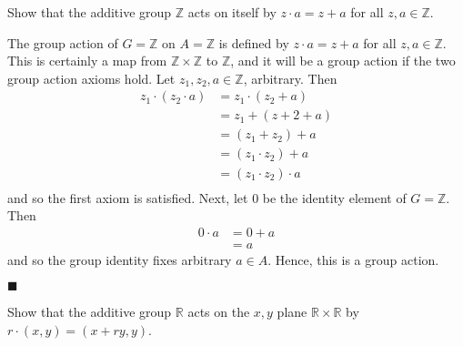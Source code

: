 \documentclass[12pt]{article}
\renewcommand{\qed}{\hfill$\blacksquare$}
\renewenvironment{proof}{\begin{addmargin}[1em]{0em}\begin{newproof}}{\end{newproof}\end{addmargin}\qed}
\newenvironment{problem}[2][Exercise]{\begin{trivlist}
\item[\hskip \labelsep {\bfseries #1}\hskip \labelsep {\bfseries #2.}]}{\end{trivlist}}
\begin{document}
\begin{problem}{1.7.2}
Show that the additive group $\mathbb{Z}$ acts on itself by $z\cdot a=z+a$ for all $z,a \in \mathbb{Z}$.
\end{problem}
\begin{proof}
The group action of $G=\mathbb{Z}$ on $A=\mathbb{Z}$ is defined by $z\cdot a=z+a$ for all $z,a \in \mathbb{Z}$. This is certainly a map from $\mathbb{Z}\times\mathbb{Z}$ to $\mathbb{Z}$, and it will be a group action if the two group action axioms hold. Let $z_1,z_2,a\in \mathbb{Z}$, arbitrary. Then
\begin{equation*}\begin{split}
z_1\cdot \left(z_2\cdot a \right) & = z_1 \cdot \left(z_2 + a\right) \\
& = z_1 + \left(z+2+a\right) \\
& = \left(z_1+z_2\right)+a \\
& = \left(z_1\cdot z_2\right)+a \\
& = \left(z_1\cdot z_2\right)\cdot a\\
\end{split}\end{equation*}
and so the first axiom is satisfied. Next, let $0$ be the identity element of $G=\mathbb{Z}$. Then
\begin{equation*}
\begin{split}
    0\cdot a & = 0 + a \\
    & = a
\end{split}
\end{equation*}
and so the group identity fixes arbitrary $a\in A$. Hence, this is a group action.
\end{proof}


\begin{problem}{1.7.3}
Show that the additive group $\mathbb{R}$ acts on the $x,y$ plane $\mathbb{R}\times\mathbb{R}$ by $r\cdot\left(x,y\right)=\left(x+ry,y\right)$.
\end{problem}
\end{document}
